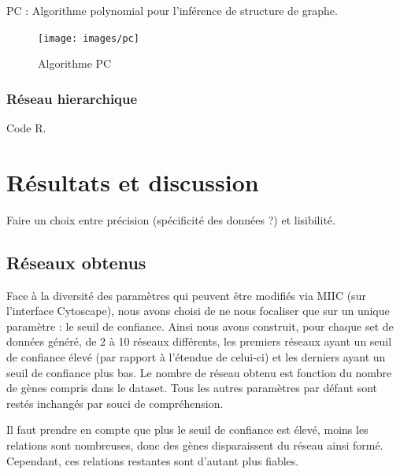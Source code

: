 \documentclass[fleqn,11pt]{SelfArx} %
\begin{document}
PC : Algorithme polynomial pour l'inférence de structure de graphe. 

\begin{figure}[ht]
\centering
\texttt{[image: images/pc]}
\caption{Algorithme PC}
\label{fig:pcd}
\end{figure}


\subsubsection{Réseau hierarchique}
Code R. 



\section{Résultats et discussion}
Faire un choix entre précision (spécificité des données ?) et lisibilité. 
\subsection{Réseaux obtenus}
Face à la diversité des paramètres qui peuvent être modifiés via MIIC (sur l'interface Cytoscape), nous avons choisi de ne nous focaliser que sur un unique paramètre : le seuil de confiance. Ainsi nous avons construit, pour chaque set de données généré, de 2 à 10 réseaux différents, les premiers réseaux ayant un seuil de confiance élevé (par rapport à l'étendue de celui-ci) et les derniers ayant un seuil de confiance plus bas. Le nombre de réseau obtenu est fonction du nombre de gènes compris dans le dataset. Tous les autres paramètres par défaut sont restés inchangés par souci de compréhension. 



Il faut prendre en compte que plus le seuil de confiance est élevé, moins les relations sont nombreuses, donc des gènes disparaissent du réseau ainsi formé. Cependant, ces relations restantes sont d'autant plus fiables. 
\end{document}
